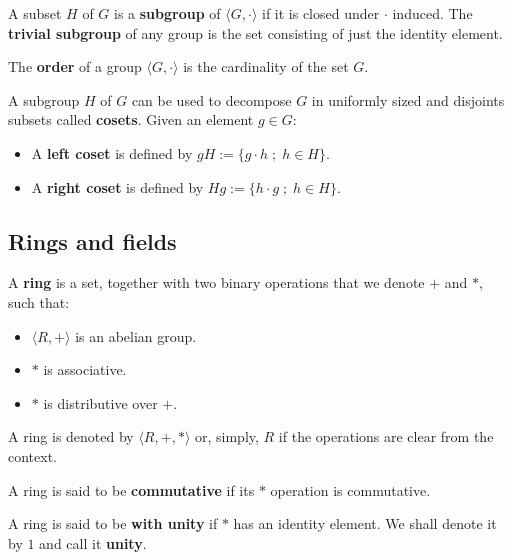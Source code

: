 \documentclass[a4paper,12pt]{article}
\begin{document}
\begin{definition}
  A subset $H$ of $G$ is a \textbf{subgroup} of $\langle G,\cdot \rangle$ if it is
  closed under $\cdot$ induced. The \textbf{trivial subgroup} of any
  group is the set consisting of just the identity element.
\end{definition}

\begin{definition}
  The \textbf{order} of a group $\langle G,\cdot\rangle$ is the cardinality of the set $G$.
\end{definition}

\begin{definition}
  A subgroup $H$ of $G$ can be used to decompose $G$ in uniformly sized and
  disjoints subsets called \textbf{cosets}. Given an element $g \in G$:
  \begin{itemize}
  \item A \textbf{left coset} is defined by $gH := \{g\cdot h \; ; \; h \in H\}$.
  \item A \textbf{right coset} is defined by $Hg := \{h\cdot g \; ; \; h \in H\}$.
  \end{itemize}
\end{definition}   
\subsection{Rings and fields}
\label{sec:orgb0fdacd}
   \begin{definition}
A \textbf{ring} is a set, together with two binary operations that we denote 
$+$ and $*$, such that:
\begin{itemize}
\item $\langle R,+\rangle$ is an abelian group.
\item $*$ is associative.
\item $*$ is distributive over $+$.
\end{itemize}

A ring is denoted by $\langle R,+,*\rangle$ or, simply, $R$ if the operations are clear from the context.
\end{definition}

\begin{definition}
  A ring is said to be \textbf{commutative} if its $*$ operation is commutative.
\end{definition}

\begin{definition}
  A ring is said to be \textbf{with unity} if $*$ has an identity element. We
  shall denote it by $1$ and call it  \textbf{unity}.

\end{definition}
\end{document}
